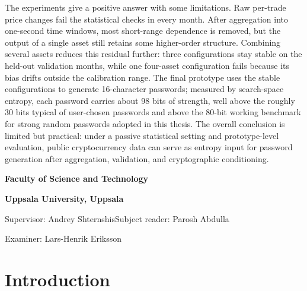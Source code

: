 \documentclass[11pt,titlepage,openany,oneside]{book}  %
\newcommand{\ThesisSupervisor}{Andrey Shternshis}
\newcommand{\ThesisReviewer}{Parosh Abdulla}
\newcommand{\ThesisExaminer}{Lars-Henrik Eriksson}
\newcommand{\ThesisFaculty}{Faculty of Science and Technology}
\newcommand{\ThesisPlace}{Uppsala}
\begin{document}
The experiments give a positive answer with some limitations. Raw per-trade price changes fail the statistical checks in every month. After aggregation into one-second time windows, most short-range dependence is removed, but the output of a single asset still retains some higher-order structure. Combining several assets reduces this residual further: three configurations stay stable on the held-out validation months, while one four-asset configuration fails because its bias drifts outside the calibration range. The final prototype uses the stable configurations to generate 16-character passwords; measured by search-space entropy, each password carries about 98 bits of strength, well above the roughly 30 bits typical of user-chosen passwords and above the 80-bit working benchmark for strong random passwords adopted in this thesis. The overall conclusion is limited but practical: under a passive statistical setting and prototype-level evaluation, public cryptocurrency data can serve as entropy input for password generation after aggregation, validation, and cryptographic conditioning.

\vfill
\begin{center}
\setlength{\parskip}{0pt}
  {\sffamily\small\color{gray}\textbf{\ThesisFaculty}\par}
  \vspace{0.10cm}
  {\sffamily\small\color{gray}\textbf{Uppsala University, \ThesisPlace}\par}
  \vspace{0.3cm}
  {\sffamily\footnotesize\color{gray}Supervisor: \ThesisSupervisor\quad Subject reader: \ThesisReviewer\par}
  \vspace{0.10cm}
  {\sffamily\footnotesize\color{gray}Examiner: \ThesisExaminer\par}
\end{center}

\clearpage
\setcounter{page}{1}
\tableofcontents
\listoffigures
\listoftables

\mainmatter

\chapter{Introduction}
\label{cha:introduction}
\end{document}

